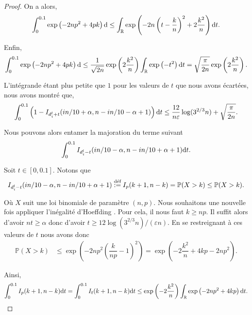 \begin{proof}
    On a alors,
    \[
        \int_0^{0.1}\exp\left( -2np^2 + 4p{k} \right)\mathrm{d} \leq  \int_{\mathbb{R}}\exp\left( -2n\left(t - \dfrac{{k}}{n}\right)^2 + 2 \dfrac{{k}^2}{n} \right)\mathrm{d} t.
    \]

    Enfin,
    \[
        \int_0^{0.1}\exp\left( -2np^2 + 4p{k} \right)\mathrm{d} \leq \dfrac{1}{\sqrt{2n}}\exp\left( 2 \dfrac{{k}^2}{n} \right) \int_{\mathbb{R}}\exp\left( -t^2 \right)\mathrm{d} t = \sqrt{\dfrac{\pi}{2n}}\exp\left( 2 \dfrac{{k}^2}{n} \right).
    \]

    L'intégrande étant plus petite que \(1\) pour les valeurs de \(t\) que nous avons écartées, nous avons montré que,
    \begin{align}
        \int_{0}^{0.1}\left( 1 - I_{d_i^l + t}(in/10 + \alpha, n - in/10 -  \alpha + 1) \right) \mathrm{d} t \leq \dfrac{12}{n\varepsilon}\log(3^{2/3}n) + \sqrt{\dfrac{\pi}{2n}}.
    \end{align}

    Nous pouvons alors entamer la majoration du terme suivant 
    \[
        \int_{0}^{0.1}I_{d_i^l - t}(in/10 - \alpha, n - in/10 +  \alpha + 1) \mathrm{d} t.    
    \]

    \newcommand{\kfloor}{{k}}
    Soit \(t \in [0, 0.1]\). Notons que 
    \[
        \begin{array}[]{rcl}
            I_{d_i^l - t}(in/10 - \alpha, n - in/10 +  \alpha + 1) \overset{\text{déf}}{:=} I_{p}(k+1, n - k) = \mathbb P(X > k) \leq \mathbb P(X > \kfloor).
        \end{array}    
    \]

    Où \(X\) suit une loi binomiale de paramètre \((n,p)\). Nous souhaitons une nouvelle fois appliquer l'inégalité d'{\sc Hoeffding} \cite{10.5555/3134214}. Pour cela, il nous faut \(\kfloor \geq np\). Il suffit alors d'avoir \(nt \geq \alpha\) donc d'avoir \(t \geq 12\log(3^{2/3}n)/(\varepsilon n)\). En se restreignant à ces valeurs de \(t\) nous avons donc 
    \begin{align*}
        \mathbb P(X > \kfloor) & \leq \exp\left( -2np^2\left( \dfrac{\kfloor}{np} - 1 \right)^2 \right) = \exp\left(  -2\dfrac{\kfloor^2}{n} +4\kfloor p  - 2np^2  \right).
    \end{align*}

    Ainsi,
    \begin{align*}
        \int_0^{0.1} I_{p}(k+1, n - k) \dt t = \int_{0}^{0.1} I_{t}(k+1, n - k) \dt t \leq \exp\left( -2\dfrac{\kfloor^2}{n} \right) \int_\R \exp\left( -2np^2 + 4\kfloor p \right)\dt t.
    \end{align*}


\end{proof}
